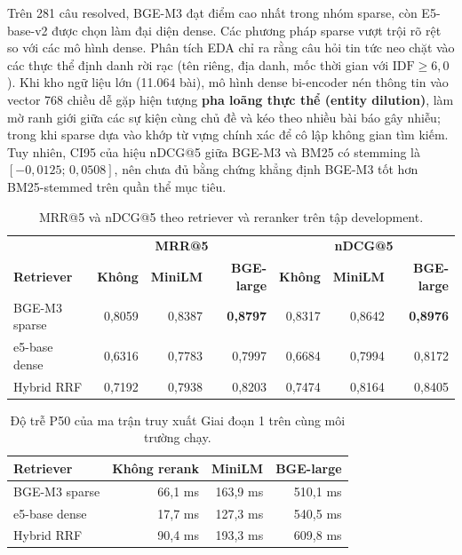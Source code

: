Trên 281 câu resolved, BGE-M3 đạt điểm cao nhất trong nhóm sparse, còn E5-base-v2 được chọn làm đại diện dense. Các phương pháp sparse vượt trội rõ rệt so với các mô hình dense. Phân tích EDA chỉ ra rằng câu hỏi tin tức neo chặt vào các thực thể định danh rời rạc (tên riêng, địa danh, mốc thời gian với $\text{IDF} \ge 6{,}0$). Khi kho ngữ liệu lớn (11.064 bài), mô hình dense bi-encoder nén thông tin vào vector 768 chiều dễ gặp hiện tượng \textbf{pha loãng thực thể (entity dilution)}, làm mờ ranh giới giữa các sự kiện cùng chủ đề và kéo theo nhiều bài báo gây nhiễu; trong khi sparse dựa vào khớp từ vựng chính xác để cô lập không gian tìm kiếm. Tuy nhiên, CI95 của hiệu nDCG@5 giữa BGE-M3 và BM25 có stemming là $[-0{,}0125;\,0{,}0508]$, nên chưa đủ bằng chứng khẳng định BGE-M3 tốt hơn BM25-stemmed trên quần thể mục tiêu.
\begin{table}[H]
  \centering
  \caption{MRR@5 và nDCG@5 theo retriever và reranker trên tập development.}
  \label{tab:phase1-reranker-matrix}
  \small
  \setlength{\tabcolsep}{4.5pt}
  \begin{tabular}{lrrr|rrr}
    \toprule
    & \multicolumn{3}{c|}{\textbf{MRR@5}}
    & \multicolumn{3}{c}{\textbf{nDCG@5}} \\
    \textbf{Retriever} & \textbf{Không} & \textbf{MiniLM} & \textbf{BGE-large}
    & \textbf{Không} & \textbf{MiniLM} & \textbf{BGE-large} \\
    \midrule
    BGE-M3 sparse & 0,8059 & 0,8387 & \textbf{0,8797} & 0,8317 & 0,8642 & \textbf{0,8976} \\
    e5-base dense & 0,6316 & 0,7783 & 0,7997 & 0,6684 & 0,7994 & 0,8172 \\
    Hybrid RRF    & 0,7192 & 0,7938 & 0,8203 & 0,7474 & 0,8164 & 0,8405 \\
    \bottomrule
  \end{tabular}
\end{table}

\begin{table}[H]
  \centering
  \caption{Độ trễ P50 của ma trận truy xuất Giai đoạn 1 trên cùng môi trường chạy.}
  \label{tab:phase1-reranker-latency}
  \small\setlength{\tabcolsep}{6pt}
  \begin{tabular}{lrrr}
    \toprule
    \textbf{Retriever} & \textbf{Không rerank} & \textbf{MiniLM} &
    \textbf{BGE-large} \\
    \midrule
    BGE-M3 sparse & 66,1 ms & 163,9 ms & 510,1 ms \\
    e5-base dense & 17,7 ms & 127,3 ms & 540,5 ms \\
    Hybrid RRF    & 90,4 ms & 193,3 ms & 609,8 ms \\
    \bottomrule
  \end{tabular}
\end{table}

